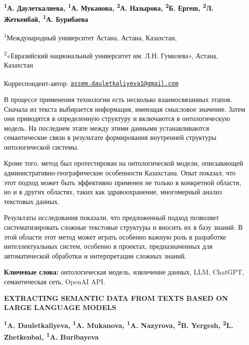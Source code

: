 
\begin{articleheader}

{\bfseries
\textsuperscript{1}А. Даулеткалиева\textsuperscript{\envelope },
\textsuperscript{1}А. Муканова,
\textsuperscript{2}А. Назырова,
\textsuperscript{2}Б. Ергеш,
\textsuperscript{2}Л. Жеткенбай,
\textsuperscript{1}А. Бурибаева
}
\end{articleheader}

\begin{affiliation}
\textsuperscript{1}Международный университет Астана, Астана, Казахстан,

\textsuperscript{2}«Евразийский национальный университет им. Л.Н. Гумилева», Астана, Казахстан

\raggedright \textsuperscript{\envelope }Корреспондент-автор:
\href{mailto:assem.dauletkaliyeva1@gmail.com}{\nolinkurl{assem.dauletkaliyeva1@gmail.com}}
\end{affiliation}

В процессе применения технологии есть несколько взаимосвязанных этапов.
Сначала из текста выбирается информация, имеющая смысловое значение.
Затем они приводятся в определенную структуру и включаются в
онтологическую модель. На последнем этапе между этими данными
устанавливаются семантические связи в результате формирования внутренней
структуры онтологической системы.

Кроме того, метод был протестирован на онтологической модели,
описывающей административно-географические особенности Казахстана. Опыт
показал, что этот подход может быть эффективно применен не только в
конкретной области, но и в других областях, таких как здравоохранение,
многомерный анализ текстовых данных.

Результаты исследования показали, что предложенный подход позволяет
систематизировать сложные текстовые структуры и вносить их в базу
знаний. В этой области этот метод может играть особенно важную роль в
разработке интеллектуальных систем, особенно в проектах, предназначенных
для автоматической обработки и интерпретации сложных знаний.

{\bfseries Ключевые слова:} онтологическая модель, извлечение данных, LLM,
ChatGPT, семантическая сеть, OpenAI API.

\begin{articleheader}
{\bfseries EXTRACTING SEMANTIC DATA FROM TEXTS BASED ON LARGE LANGUAGE MODELS}

{\bfseries
\textsuperscript{1}A. Dauletkaliyeva\textsuperscript{\envelope },
\textsuperscript{1}A. Mukanova,
\textsuperscript{1}A. Nazyrova,
\textsuperscript{2}B. Yergesh,
\textsuperscript{2}L. Zhetkenbai,
\textsuperscript{1}A. Buribayeva
}
\end{articleheader}

